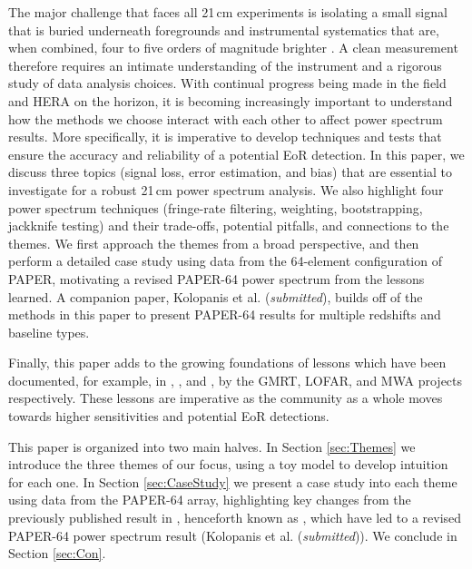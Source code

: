 \documentclass[preprint2,numberedappendix,tighten]{aastex6}
\begin{document}
The major challenge that faces all 21\,cm experiments is isolating a small signal that is buried underneath foregrounds and 
instrumental systematics that are, when combined, four to five orders of magnitude brighter \citep[e.g.,][]{santos_et_al2005, ali_et_al2008, deOliveiraCosta_et_al2008, jelic_et_al2008, bernardi_et_al2009, bernardi_et_al2010, ghosh_et_al2011, pober_et_al2013b, bernardi_et_al2013, dillon_et_al2014, kohn_et_al2016}. A clean measurement therefore requires an intimate understanding of the instrument and a rigorous study of data analysis choices. With continual progress being made 
in the field and HERA on the horizon, it is becoming increasingly important to understand how the methods we choose interact 
with each other to affect power spectrum results. More specifically, it is imperative to develop techniques and tests that ensure 
the accuracy and reliability of a potential EoR detection. In this paper, we discuss three topics (signal loss, error estimation, and bias) that are essential to investigate 
for a robust 21\,cm power spectrum analysis. We also highlight four power spectrum techniques (fringe-rate filtering, weighting, bootstrapping, jackknife testing) and their trade-offs, potential 
pitfalls, and connections to the themes. We first approach the themes from a broad perspective, and then perform a detailed 
case study using data from the 64-element configuration of PAPER, motivating a revised PAPER-64 power spectrum 
from the lessons learned. A companion paper, Kolopanis et al. (\textit{submitted}), builds off of the methods in this paper to present PAPER-64 results for multiple redshifts and baseline types.

Finally, this paper adds to the growing foundations of lessons which have been documented, for example, in \citet{Paciga2013}, \citet{Patil2016}, and \citet{Jacobs2016}, by the GMRT, LOFAR, and MWA projects respectively. These lessons are imperative as the community as a whole moves towards higher sensitivities and potential EoR detections.

This paper is organized into two main halves. In Section \ref{sec:Themes} we introduce the three themes of our focus, using a 
toy model to develop intuition for each one. In Section \ref{sec:CaseStudy} we present a case study into each theme using data 
from the PAPER-64 array, highlighting key changes from the previously published result in \citet{ali_et_al2015}, henceforth known as , which have led to a 
revised PAPER-64 power spectrum result (Kolopanis et al. (\textit{submitted})). We conclude in Section \ref{sec:Con}.
\end{document}
